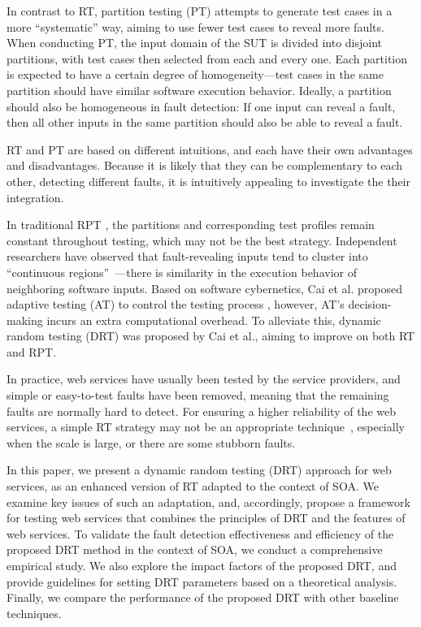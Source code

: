 \documentclass[10pt,journal,compsoc]{IEEEtran}
\begin{document}
In contrast to RT, partition testing (PT) attempts to generate test cases in a more ``systematic'' way, aiming to use fewer test cases to reveal more faults.
When conducting PT, the input domain of the SUT is divided into disjoint partitions, with test cases then selected from each and every one.
Each partition is expected to have a certain degree of homogeneity---test cases in the same partition should have similar software execution behavior.
Ideally, a partition should also be homogeneous in fault detection:
If one input can reveal a fault, then all other inputs in the same partition should also be able to reveal a fault.

RT and PT are based on different intuitions, and each have their own advantages and disadvantages.
Because it is likely that they can be complementary to each other, detecting different faults, it is intuitively appealing to investigate the their integration.

In traditional RPT \cite{cai2009random}, the partitions and corresponding test profiles remain constant throughout testing, which may not be the best strategy.
Independent researchers have observed that fault-revealing inputs tend to cluster into ``continuous regions''~\cite{Ammann88, Finelli91}---there is similarity in the execution behavior of neighboring software inputs.
Based on software cybernetics, Cai et al. proposed adaptive testing (AT) to control the testing process \cite{cai2004optimal}, however, AT's decision-making incurs an extra computational overhead. To alleviate this, dynamic random testing (DRT) \cite{cai2009random} was proposed by Cai et al., aiming to improve on both RT and RPT.

In practice, web services have usually been tested by the service providers, and simple or easy-to-test faults have been removed, meaning that the remaining faults are normally hard to detect.
For ensuring a higher reliability of the web services, a simple RT strategy may not be an appropriate technique~\cite{li2014two}, especially when the scale is large, or there are some stubborn faults.

In this paper, we present a dynamic random testing (DRT) approach for web services, as an enhanced version of RT adapted to the context of SOA.
We examine key issues of such an adaptation, and, accordingly, propose a framework for testing web services that combines the principles of DRT \cite{cai2009random} and the features of web services. To validate the fault detection effectiveness and efficiency of the proposed DRT method in the context of SOA, we conduct a comprehensive empirical study. We also explore the impact factors of the proposed DRT, and provide guidelines for setting DRT parameters based on a theoretical analysis. Finally, we compare the performance of the proposed DRT with other baseline techniques.
\end{document}
